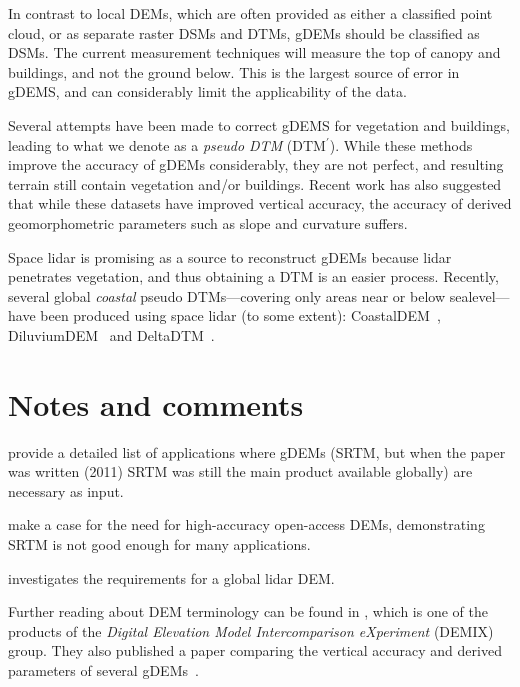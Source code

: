 In contrast to local DEMs, which are often provided as either a classified point cloud, or as separate raster DSMs and DTMs, gDEMs should be classified as DSMs.
The current measurement techniques will measure the top of canopy and buildings, and not the ground below.
This is the largest source of error in gDEMS, and can considerably limit the applicability of the data.

%

Several attempts have been made to correct gDEMS for vegetation and buildings, leading to what we denote as a \emph{pseudo DTM} (DTM$^{\prime}$).
While these methods improve the accuracy of gDEMs considerably, they are not perfect, and resulting terrain still contain vegetation and/or buildings.
Recent work has also suggested that while these datasets have improved vertical accuracy, the accuracy of derived geomorphometric parameters such as slope and curvature suffers.

%
Space lidar is promising as a source to reconstruct gDEMs because lidar penetrates vegetation, and thus obtaining a DTM is an easier process.
Recently, several global \emph{coastal} pseudo DTMs---covering only areas near or below sealevel---have been produced using space lidar (to some extent): CoastalDEM~\citep{kulpCoastalDEMV30Improving}, DiluviumDEM~\citep{dusseauDiluviumDEMEnhancedAccuracy2023} and DeltaDTM~\citep{pronkDeltaDTMGlobalCoastal2024}.


%
\section{Notes and comments}


\citet{Yang11} provide a detailed list of applications where gDEMs (SRTM, but when the paper was written (2011) SRTM was still the main product available globally) are necessary as input.

\citet{Schumann2018} make a case for the need for high-accuracy open-access DEMs, demonstrating SRTM is not good enough for many applications.

\citet{Hancock2021} investigates the requirements for a global lidar DEM\@.

Further reading about DEM terminology can be found in \citet{Guth2021}, which is one of the products of the \emph{Digital Elevation Model Intercomparison eXperiment} (DEMIX) group.
They also published a paper comparing the vertical accuracy and derived parameters of several gDEMs~\citep{guthRanking10Global2024}.

